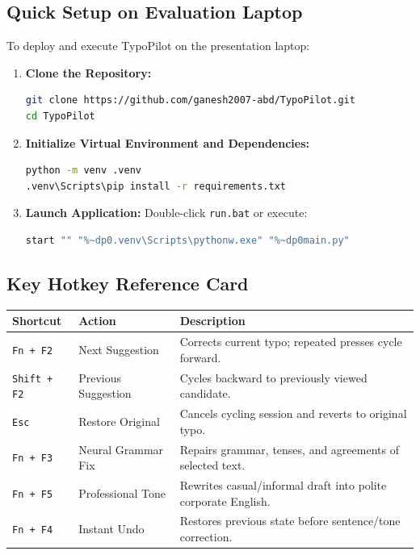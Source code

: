 \documentclass[11pt,a4paper]{article}
\begin{document}
\subsection{Quick Setup on Evaluation Laptop}
To deploy and execute TypoPilot on the presentation laptop:
\begin{enumerate}
    \item \textbf{Clone the Repository:}
    \begin{lstlisting}[language=bash]
git clone https://github.com/ganesh2007-abd/TypoPilot.git
cd TypoPilot
    \end{lstlisting}
    \item \textbf{Initialize Virtual Environment and Dependencies:}
    \begin{lstlisting}[language=bash]
python -m venv .venv
.venv\Scripts\pip install -r requirements.txt
    \end{lstlisting}
    \item \textbf{Launch Application:}
    Double-click \texttt{run.bat} or execute:
    \begin{lstlisting}[language=bash]
start "" "%~dp0.venv\Scripts\pythonw.exe" "%~dp0main.py"
    \end{lstlisting}
\end{enumerate}

\subsection{Key Hotkey Reference Card}
\begin{table}[htbp]
\centering
\begin{tabularx}{\textwidth}{llX}
\toprule
\textbf{Shortcut} & \textbf{Action} & \textbf{Description} \\
\midrule
\texttt{Fn + F2} & Next Suggestion & Corrects current typo; repeated presses cycle forward. \\
\texttt{Shift + F2} & Previous Suggestion & Cycles backward to previously viewed candidate. \\
\texttt{Esc} & Restore Original & Cancels cycling session and reverts to original typo. \\
\texttt{Fn + F3} & Neural Grammar Fix & Repairs grammar, tenses, and agreements of selected text. \\
\texttt{Fn + F5} & Professional Tone & Rewrites casual/informal draft into polite corporate English. \\
\texttt{Fn + F4} & Instant Undo & Restores previous state before sentence/tone correction. \\
\bottomrule
\end{tabularx}
\end{table}
\end{document}
